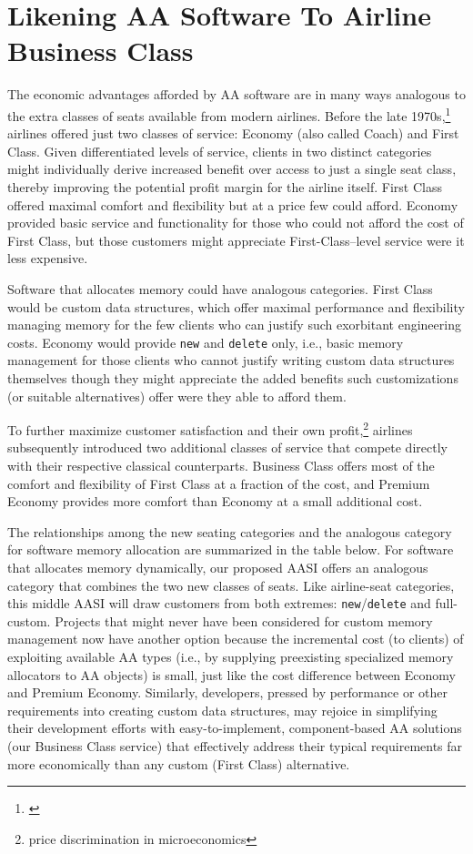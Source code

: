 \appendix
\section{Likening AA Software To Airline Business Class}
The economic advantages afforded by AA software are in many ways analogous to
the extra classes of seats available from modern airlines. Before the late 1970s,\footnote{\cite{brancatelli12}}
airlines offered just two classes of service: Economy (also called Coach) and First
Class. Given differentiated levels of service, clients in two distinct categories might
individually derive increased benefit over access to just a single seat class, thereby
improving the potential profit margin for the airline itself. First Class offered
maximal comfort and flexibility but at a price few could afford. Economy provided
basic service and functionality for those who could not afford the cost of First Class,
but those customers might appreciate First-Class–level service were it less
expensive.

Software that allocates memory could have analogous categories. First Class would
be custom data structures, which offer maximal performance and flexibility
managing memory for the few clients who can justify such exorbitant engineering
costs. Economy would provide \lstinline{new} and \lstinline{delete} only, i.e., basic memory
management for those clients who cannot justify writing custom data structures
themselves though they might appreciate the added benefits such customizations (or
suitable alternatives) offer were they able to afford them.

To further maximize customer satisfaction and their own profit,\footnote{price discrimination in microeconomics} airlines
subsequently introduced two additional classes of service that compete directly with
their respective classical counterparts. Business Class offers most of the comfort
and flexibility of First Class at a fraction of the cost, and Premium Economy
provides more comfort than Economy at a small additional cost.

The relationships among the new seating categories and the analogous category for
software memory allocation are summarized in the table below. For software that
allocates memory dynamically, our proposed AASI offers an analogous category that
combines the two new classes of seats. Like airline-seat categories, this middle AASI
will draw customers from both extremes: \lstinline{new}/\lstinline{delete} and full-custom. Projects that
might never have been considered for custom memory management now have
another option because the incremental cost (to clients) of exploiting available AA
types (i.e., by supplying preexisting specialized memory allocators to AA objects) is
small, just like the cost difference between Economy and Premium Economy.
Similarly, developers, pressed by performance or other requirements into creating
custom data structures, may rejoice in simplifying their development efforts with
easy-to-implement, component-based AA solutions (our Business Class service) that
effectively address their typical requirements far more economically than any
custom (First Class) alternative.

